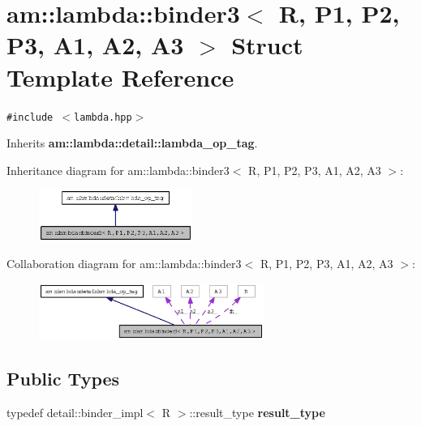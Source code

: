\section{am::lambda::binder3$<$ R, P1, P2, P3, A1, A2, A3 $>$ Struct Template Reference}
\label{structam_1_1lambda_1_1binder3}
{\tt \#include $<$lambda.hpp$>$}

Inherits {\bf am::lambda::detail::lambda\_\-op\_\-tag}.

Inheritance diagram for am::lambda::binder3$<$ R, P1, P2, P3, A1, A2, A3 $>$:\begin{figure}[H]
\begin{center}
\leavevmode
\includegraphics[width=142pt]{structam_1_1lambda_1_1binder3__inherit__graph}
\end{center}
\end{figure}
Collaboration diagram for am::lambda::binder3$<$ R, P1, P2, P3, A1, A2, A3 $>$:\begin{figure}[H]
\begin{center}
\leavevmode
\includegraphics[width=208pt]{structam_1_1lambda_1_1binder3__coll__graph}
\end{center}
\end{figure}
\subsection*{Public Types}
\begin{CompactItemize}
\item 
typedef detail::binder\_\-impl$<$ R $>$::result\_\-type \textbf{result\_\-type}\label{structam_1_1lambda_1_1binder3_4cbe90e647efd7989dedefd02c6d4942}

\end{CompactItemize}
